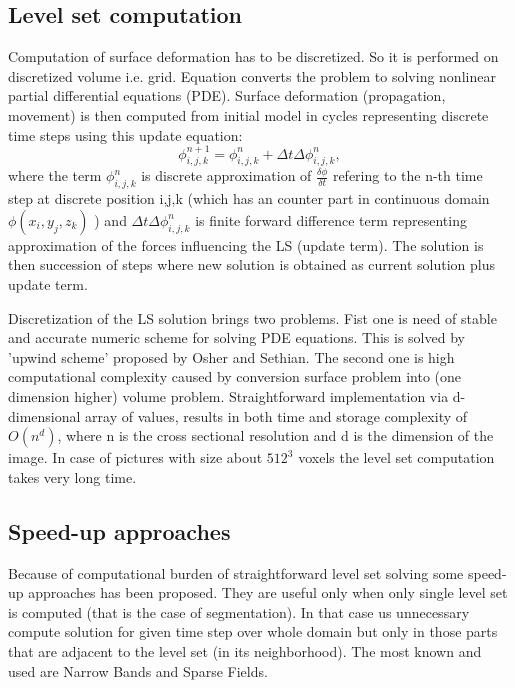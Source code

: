 \subsection{Level set computation}

Computation of surface deformation has to be discretized. So it is performed on discretized volume i.e. grid.
Equation converts the problem to solving nonlinear partial differential equations (PDE).
Surface deformation (propagation, movement) is then computed from initial model in cycles representing discrete time steps using this update equation:
\begin{equation}
\label{deformEqApprox}
\phi_{i,j,k}^{n+1} = \phi_{i,j,k}^{n} + \Delta t \Delta \phi_{i,j,k}^{n},
\end{equation}
where the term $\phi_{i,j,k}^{n}$ is discrete approximation of $\frac{\delta\phi}{\delta t}$ refering to the n-th time step at discrete position i,j,k (which has an counter part in continuous domain $\phi(x_i, y_j, z_k)$ ) and $\Delta t \Delta \phi_{i,j,k}^{n}$ is finite forward difference term representing approximation of the forces influencing the LS (update term). The solution is then succession of steps where new solution is obtained as current solution plus update term.

Discretization of the LS solution brings two problems.
Fist one is need of stable and accurate numeric scheme for solving PDE equations.
This is solved by 'upwind scheme' proposed by Osher and Sethian\cite{sethianLS}.
The second one is high computational complexity caused by conversion surface problem into (one dimension higher) volume problem.
Straightforward implementation via d-dimensional array of values, results in both time and storage complexity of $O(n^d)$, where n is the cross sectional resolution and d is the dimension of the image.
In case of pictures with size about $512^3$ voxels the level set computation takes very long time.

\subsection{Speed-up approaches}

Because of computational burden of straightforward level set solving some speed-up approaches has been proposed.
They are useful only when only single level set is computed (that is the case of segmentation).
In that case us unnecessary compute solution for given time step over whole domain but only in those parts that are adjacent to the level set (in its neighborhood).
The most known and used are Narrow Bands and Sparse Fields.

